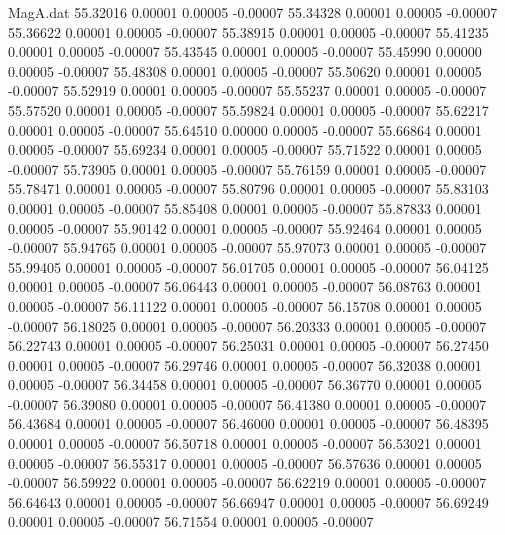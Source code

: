 \begin{filecontents}{MagA.dat}
  55.32016    0.00001    0.00005   -0.00007
  55.34328    0.00001    0.00005   -0.00007
  55.36622    0.00001    0.00005   -0.00007
  55.38915    0.00001    0.00005   -0.00007
  55.41235    0.00001    0.00005   -0.00007
  55.43545    0.00001    0.00005   -0.00007
  55.45990    0.00000    0.00005   -0.00007
  55.48308    0.00001    0.00005   -0.00007
  55.50620    0.00001    0.00005   -0.00007
  55.52919    0.00001    0.00005   -0.00007
  55.55237    0.00001    0.00005   -0.00007
  55.57520    0.00001    0.00005   -0.00007
  55.59824    0.00001    0.00005   -0.00007
  55.62217    0.00001    0.00005   -0.00007
  55.64510    0.00000    0.00005   -0.00007
  55.66864    0.00001    0.00005   -0.00007
  55.69234    0.00001    0.00005   -0.00007
  55.71522    0.00001    0.00005   -0.00007
  55.73905    0.00001    0.00005   -0.00007
  55.76159    0.00001    0.00005   -0.00007
  55.78471    0.00001    0.00005   -0.00007
  55.80796    0.00001    0.00005   -0.00007
  55.83103    0.00001    0.00005   -0.00007
  55.85408    0.00001    0.00005   -0.00007
  55.87833    0.00001    0.00005   -0.00007
  55.90142    0.00001    0.00005   -0.00007
  55.92464    0.00001    0.00005   -0.00007
  55.94765    0.00001    0.00005   -0.00007
  55.97073    0.00001    0.00005   -0.00007
  55.99405    0.00001    0.00005   -0.00007
  56.01705    0.00001    0.00005   -0.00007
  56.04125    0.00001    0.00005   -0.00007
  56.06443    0.00001    0.00005   -0.00007
  56.08763    0.00001    0.00005   -0.00007
  56.11122    0.00001    0.00005   -0.00007
  56.15708    0.00001    0.00005   -0.00007
  56.18025    0.00001    0.00005   -0.00007
  56.20333    0.00001    0.00005   -0.00007
  56.22743    0.00001    0.00005   -0.00007
  56.25031    0.00001    0.00005   -0.00007
  56.27450    0.00001    0.00005   -0.00007
  56.29746    0.00001    0.00005   -0.00007
  56.32038    0.00001    0.00005   -0.00007
  56.34458    0.00001    0.00005   -0.00007
  56.36770    0.00001    0.00005   -0.00007
  56.39080    0.00001    0.00005   -0.00007
  56.41380    0.00001    0.00005   -0.00007
  56.43684    0.00001    0.00005   -0.00007
  56.46000    0.00001    0.00005   -0.00007
  56.48395    0.00001    0.00005   -0.00007
  56.50718    0.00001    0.00005   -0.00007
  56.53021    0.00001    0.00005   -0.00007
  56.55317    0.00001    0.00005   -0.00007
  56.57636    0.00001    0.00005   -0.00007
  56.59922    0.00001    0.00005   -0.00007
  56.62219    0.00001    0.00005   -0.00007
  56.64643    0.00001    0.00005   -0.00007
  56.66947    0.00001    0.00005   -0.00007
  56.69249    0.00001    0.00005   -0.00007
  56.71554    0.00001    0.00005   -0.00007

\end{filecontents}

